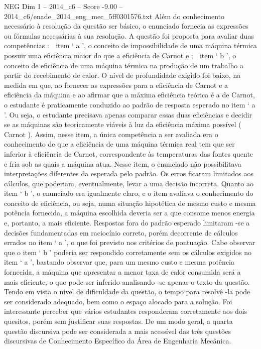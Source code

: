 \begin{textsample}{NEG Dim 1 – 2014\_c6 – Score -9.00 – 2014\_c6/enade\_2014\_eng\_mec\_5ff0301576.txt}
Além do conhecimento necessário à resolução da questão ser básico, o enunciado fornecia as expressões ou fórmulas necessárias à sua resolução.
A questão foi proposta para avaliar duas competências :  item ‘ a ’, o conceito de impossibilidade de uma máquina térmica possuir uma eficiência maior do que a eficiência de Carnot e ;  item ‘ b ’, o conceito de eficiência de uma máquina térmica na produção de um trabalho a partir do recebimento de calor.
O nível de profundidade exigido foi baixo, na medida em que, ao fornecer as expressões para a eficiência de Carnot e a eficiência da máquina e ao afirmar que a máxima eficiência teórica é a de Carnot, o estudante é praticamente conduzido ao padrão de resposta esperado no item ‘ a ’.
Ou seja, o estudante precisava apenas comparar essas duas eficiências e decidir se as máquinas são teoricamente viáveis à luz da eficiência máxima possível ( Carnot ).
Assim, nesse item, a única competência a ser avaliada era o conhecimento de que a eficiência de uma máquina térmica real tem que ser inferior à eficiência de Carnot, correspondente às temperaturas das fontes quente e fria sob as quais a máquina atua.
Nesse item, o enunciado não possibilitava interpretações diferentes da esperada pelo padrão.
Os erros ficaram limitados aos cálculos, que poderiam, eventualmente, levar a uma decisão incorreta.
Quanto ao item ‘ b ’, o enunciado era igualmente claro, e o item avaliava o conhecimento do conceito de eficiência, ou seja, numa situação hipotética de mesmo custo e mesma potência fornecida, a máquina escolhida deveria ser a que consome menos energia e, portanto, a mais eficiente.
Respostas fora do padrão esperado limitaram -se a decisões fundamentadas em raciocínio correto, porém decorrente de cálculos errados no item ‘ a ’, o que foi previsto nos critérios de pontuação.
Cabe observar que o item ‘ b ’ poderia ser respondido corretamente sem os cálculos exigidos no item ‘ a ’, bastando observar que, para um mesmo custo e mesma potência fornecida, a máquina que apresentar a menor taxa de calor consumida será a mais eficiente, o que pode ser inferido analisando -se apenas o texto da questão.
Tendo em vista o nível de dificuldade da questão, o tempo para resolvê -la pode ser considerado adequado, bem como o espaço alocado para a solução.
Foi interessante perceber que vários estudantes responderam corretamente aos dois quesitos, porém sem justificar suas respostas.
De um modo geral, a quarta questão discursiva pode ser considerada a mais acessível das três questões discursivas de Conhecimento Específico da Área de Engenharia Mecânica.

\end{textsample}
